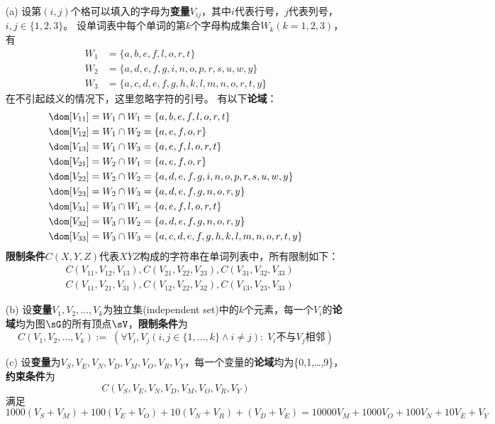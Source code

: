 \documentclass[a4paper, 11pt]{article}
\begin{document}
\begin{answer}
\begin{itemize}
\item [(a)] 设第$(i,j)$个格可以填入的字母为\textbf{变量}$V_{ij}$，其中$i$代表行号，$j$代表列号，$i,j\in\{1,2,3\}$。
设单词表中每个单词的第$k$个字母构成集合$W_k(k=1,2,3)$，有
\[\begin{aligned}
    W_1 &= \{a,b,e,f,l,o,r,t\}\\
    W_2 &= \{a,d,e,f,g,i,n,o,p,r,s,u,w,y\}\\
    W_3 &= \{a,c,d,e,f,g,h,k,l,m,n,o,r,t,y\}
\end{aligned}\]
在不引起歧义的情况下，这里忽略字符的引号。
有以下\textbf{论域}：
\[\begin{aligned}
\dom[V_{11}] &= W_1\cap W_1 = \{a,b,e,f,l,o,r,t\}\\
\dom[V_{12}] &= W_1\cap W_2 = \{a,e,f,o,r\}\\
\dom[V_{13}] &= W_1\cap W_3 = \{a,e,f,l,o,r,t\}\\
\dom[V_{21}] &= W_2\cap W_1 = \{a,e,f,o,r\}\\
\dom[V_{22}] &= W_2\cap W_2 = \{a,d,e,f,g,i,n,o,p,r,s,u,w,y\}\\
\dom[V_{23}] &= W_2\cap W_3 = \{a,d,e,f,g,n,o,r,y\}\\
\dom[V_{31}] &= W_3\cap W_1 = \{a,e,f,l,o,r,t\}\\
\dom[V_{32}] &= W_3\cap W_2 = \{a,d,e,f,g,n,o,r,y\}\\
\dom[V_{33}] &= W_3\cap W_3 = \{a,c,d,e,f,g,h,k,l,m,n,o,r,t,y\}
\end{aligned}\]
\textbf{限制条件}$C(X,Y,Z)$代表$\overline{XYZ}$构成的字符串在单词列表中，所有限制如下：
\[\begin{aligned}
    & C(V_{11},V_{12},V_{13}),C(V_{21},V_{22},V_{23}),C(V_{31},V_{32},V_{33})\\
    & C(V_{11},V_{21},V_{31}),C(V_{12},V_{22},V_{32}),C(V_{13},V_{23},V_{33})
\end{aligned}\]

\item [(b)] 设\textbf{变量}$V_1,V_2,\ldots,V_k$为独立集(independent set)中的$k$个元素，每一个$V_i$的\textbf{论域}均为图$\sG$的所有顶点$\sV$，\textbf{限制条件}为
\[C(V_1,V_2,\ldots,V_k):=\;(\forall V_i,V_j(i,j\in\{1,\ldots,k\}\land i\ne j):\;V_i\text{不与}V_j\text{相邻})\]

\item [(c)] 设\textbf{变量}为$V_S,V_E,V_N,V_D,V_M,V_O,V_R,V_Y$，每一个变量的\textbf{论域}均为\{0,1,\ldots,9\}，\textbf{约束条件}为
\[C(V_S,V_E,V_N,V_D,V_M,V_O,V_R,V_Y)\]
满足
\[1000(V_S+V_M)+100(V_E+V_O)+10(V_N+V_R)+(V_D+V_E)=10000V_M+1000V_O+100V_N+10V_E+V_Y\]
\end{itemize}
\end{answer}
\end{document}
